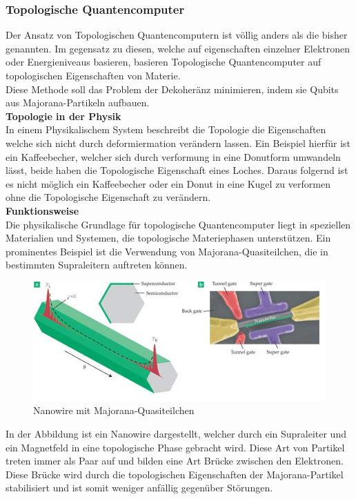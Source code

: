 \subsubsection{Topologische Quantencomputer}
\label{subsub:topologische_quantencomputer}
Der Ansatz von Topologischen Quantencomputern ist völlig anders als die bisher genannten. Im gegensatz zu diesen, welche auf eigenschaften einzelner Elektronen oder Energieniveaus basieren, basieren Topologische Quantencomputer auf topologischen Eigenschaften von Materie.\\
Diese Methode soll das Problem der Dekoheränz minimieren, indem sie Qubits aus Majorana-Partikeln aufbauen.\\

\textbf{Topologie in der Physik}\\
In einem Physikalischem System beschreibt die Topologie die Eigenschaften welche sich nicht durch deformiermation verändern lassen.
Ein Beispiel hierfür ist ein Kaffeebecher, welcher sich durch verformung in eine Donutform umwandeln lässt, beide haben die Topologische Eigenschaft eines Loches.
Daraus folgernd ist es nicht möglich ein Kaffeebecher oder ein Donut in eine Kugel zu verformen ohne die Topologische Eigenschaft zu verändern.\\

\textbf{Funktionsweise}\\
Die physikalische Grundlage für topologische Quantencomputer liegt in speziellen Materialien und Systemen, die topologische Materiephasen unterstützen.
Ein prominentes Beispiel ist die Verwendung von Majorana-Quasiteilchen, die in bestimmten Supraleitern auftreten können.\\

\begin{figure}[!ht]
    \centering
    \includegraphics[width=0.75\linewidth]{img/Majorana.png}
    \caption{Nanowire mit Majorana-Quasiteilchen}
    \label{fig:Majorana}
\end{figure}

In der Abbildung ist ein Nanowire dargestellt, welcher durch ein Supraleiter und ein Magnetfeld in eine topologische Phase gebracht wird.
Diese Art von Partikel treten immer als Paar auf und bilden eine Art Brücke zwischen den Elektronen. Diese Brücke wird durch die topologischen Eigenschaften der Majorana-Partikel stabilisiert und ist somit weniger anfällig gegenüber Störungen.\\

